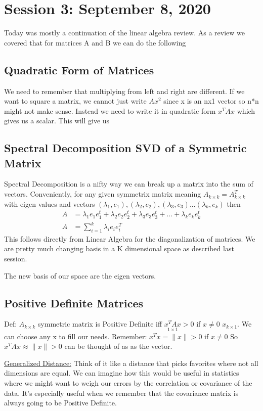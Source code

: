 \chapter{Session 3: September 8, 2020}
\label{sec:third}
Today was mostly a continuation of the linear algebra review. As a review we covered that for matrices A and B we can do the following
\section{Quadratic Form of Matrices}
We need to remember that multiplying from left and right are different. If we want to square a matrix, we cannot just write \(Ax^2\) since x is an nx1 vector so n*n might not make sense. Instead we need to write it in quadratic form \(x^TAx\) which gives us a scalar. This will give us

\section{Spectral Decomposition SVD of a Symmetric Matrix}
Spectral Decomposition is a nifty way we can break up a matrix into the sum of vectors. Conveniently, for any given symmetrix matrix meaning \(A_{k \times k}=A^T_{k \times k}\) with eigen values and vectors \((\lambda_1,e_1),(\lambda_2,e_2),(\lambda_3,e_3)...(\lambda_k,e_k)\) then
\begin{align*}
    A &= \lambda_1 e_1 e_1^t + \lambda_2 e_2 e_2^t + \lambda_3 e_3 e_3^t + ...+ \lambda_k e_k e_k^t \\
    A &= \displaystyle\sum^{k}_{i=1}\lambda_i e_i e_i^T
\end{align*}
This follows directly from Linear Algebra for the diagonalization of matrices. We are pretty much changing basis in a K dimensional space as described last session.

The new basis of our space are the eigen vectors.

\section{Positive Definite Matrices}
Def: \(A_{k \times k}\) symmetric matrix is Positive Definite iff \(\underset{1 \times 1}{x^TAx} > 0\) if $x\neq 0$ $x_{k\times 1}$. We can choose any x to fill our needs.
Remember: \(x^Tx = \| x \| > 0 \) if \(x \neq 0\)
So  \(x^TAx \approx \| x \| > 0 \) can be thought of as as the vector.

\underline{Generalized Distance:}  Think of it like a distance that picks favorites where not all dimensions are equal. We can imagine how this would be useful in statistics where we might want to weigh our errors by the correlation or covariance  of the data. It's especially useful when we remember that the covariance matrix is always going to be Positive Definite.

